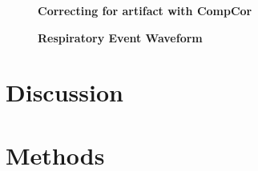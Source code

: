 \documentclass[9pt]{NEU502b-fmri}
\begin{document}
\begin{figure}
\centerline{%
%
}
\caption{\textbf{Correcting for artifact with CompCor}}

\end{figure}

\begin{figure}
\centerline{%
%
}
\caption{\textbf{Respiratory Event Waveform}}

\end{figure}

\section{Discussion}

\section{Methods}
\end{document}
